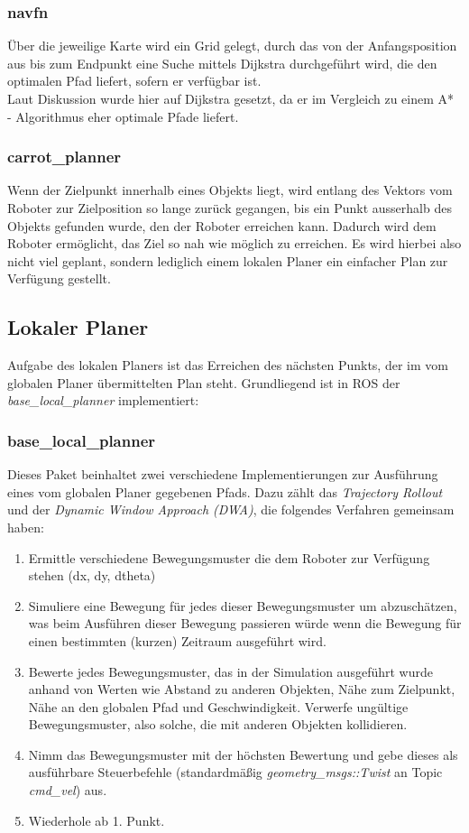 \documentclass[oribibl]{llncs}
\begin{document}
\subsubsection{navfn}
Über die jeweilige Karte wird ein Grid gelegt, durch das von der Anfangsposition aus bis zum Endpunkt eine Suche mittels Dijkstra durchgeführt wird, die den optimalen Pfad liefert, sofern er verfügbar ist.\\
Laut Diskussion wurde hier auf Dijkstra gesetzt, da er im Vergleich zu einem A* - Algorithmus eher optimale Pfade liefert. \cite{navfn}
\subsubsection{carrot\_planner}
Wenn der Zielpunkt innerhalb eines Objekts liegt, wird entlang des Vektors vom Roboter zur Zielposition so lange zurück gegangen, bis ein Punkt ausserhalb des Objekts gefunden wurde, den der Roboter erreichen kann. Dadurch wird dem Roboter ermöglicht, das Ziel so nah wie möglich zu erreichen. Es wird hierbei also nicht viel geplant, sondern lediglich einem lokalen Planer ein einfacher Plan zur Verfügung gestellt. \cite{carrotPlanner}

\subsection{Lokaler Planer}
Aufgabe des lokalen Planers ist das Erreichen des nächsten Punkts, der im vom globalen Planer übermittelten Plan steht. Grundliegend ist in ROS der \textit{base\_local\_planner} implementiert: \subsubsection{base\_local\_planner}
Dieses Paket beinhaltet zwei verschiedene Implementierungen zur Ausführung eines vom globalen Planer gegebenen Pfads. Dazu zählt das \textit{Trajectory Rollout} und der \textit{Dynamic Window Approach (DWA)}, die folgendes Verfahren gemeinsam haben:
\begin{enumerate}	
\item Ermittle verschiedene Bewegungsmuster die dem Roboter zur Verfügung stehen (dx, dy, dtheta)
\item Simuliere eine Bewegung für jedes dieser Bewegungsmuster um abzuschätzen, was beim Ausführen dieser Bewegung passieren würde wenn die Bewegung für einen bestimmten (kurzen) Zeitraum ausgeführt wird.
\item Bewerte jedes Bewegungsmuster, das in der Simulation ausgeführt wurde anhand von Werten wie Abstand zu anderen Objekten, Nähe zum Zielpunkt, Nähe an den globalen Pfad und Geschwindigkeit. Verwerfe ungültige Bewegungsmuster, also solche, die mit anderen Objekten kollidieren.
\item Nimm das Bewegungsmuster mit der höchsten Bewertung und gebe dieses als ausführbare Steuerbefehle (standardmäßig \textit{geometry\_msgs::Twist} an Topic \textit{cmd\_vel}) aus.
\item Wiederhole ab 1. Punkt.
\end{enumerate}
\end{document}
